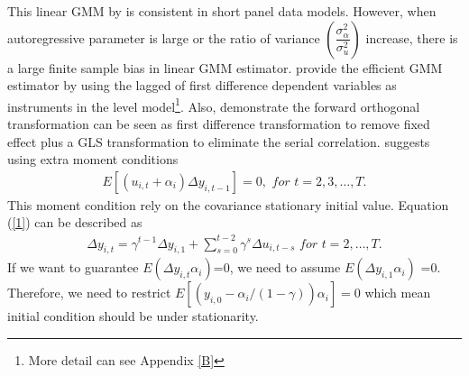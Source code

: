 \documentclass[12pt,a4paper,hyperref]{article}
\begin{document}
This linear GMM by \citet{Arellano:1991} is consistent in short panel data models. However, when autoregressive parameter is large or the ratio of variance $(\dfrac{\sigma_{\alpha}^{2}}{\sigma_{u}^{2}})$ increase, there is a large finite sample bias in linear GMM estimator. \citet{Arellano:1995} provide the efficient GMM estimator by using the lagged of first difference dependent variables as instruments in the level model\footnote{More detail can see Appendix \ref{B}}. Also, \citet{Arellano:1995} demonstrate the forward orthogonal transformation can be seen as first difference transformation to remove fixed effect plus a GLS transformation to eliminate the serial correlation.
\citet{Blundell:1998} suggests using extra moment conditions
\begin{align}
E\left[\left( u_{i,t}+\alpha_{i}\right)\Delta y_{i,t-1} \right]=0, \,\, for\,\, t=2,3, \ldots, T. \label{15}
\end{align}
This moment condition rely on the covariance stationary initial value. Equation (\ref{1}) can be described as 
\begin{align}
\Delta y_{i,t}= \gamma^{t-1} \Delta y_{i,1}+ \sum^{t-2}_{s=0}\gamma^{s}\Delta u_{i,t-s} \,\, for \,\, t=2,\ldots, T.
\end{align}
If we want to guarantee $E\left(\Delta y_{i,t} \alpha_{i} \right)$=0, we need to assume $E\left(\Delta y_{i,1} \alpha_{i} \right)$ =0. Therefore, we need to restrict $E\left[\left(y_{i,0}-\alpha_{i}/(1-\gamma) \right)\alpha_{i} \right]=0$ which mean 
initial condition should be under stationarity.  
\end{document}
